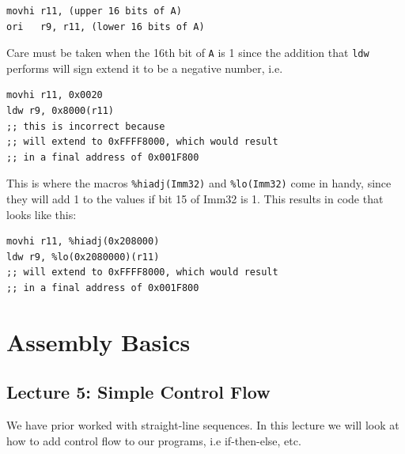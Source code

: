 \documentclass[../notes.tex]{subfiles}
\begin{document}
\begin{listing}[H]
\begin{verbatim}
movhi r11, (upper 16 bits of A)
ori   r9, r11, (lower 16 bits of A)
\end{verbatim}
\end{listing}


Care must be taken when the 16th bit of \texttt{A}  is 1 since the addition that \texttt{ldw} performs will sign extend it to be a negative number, i.e. 

\begin{listing}[H]
	\begin{verbatim}
movhi r11, 0x0020
ldw r9, 0x8000(r11)
;; this is incorrect because
;; will extend to 0xFFFF8000, which would result
;; in a final address of 0x001F800
\end{verbatim}
\end{listing}


This is where the macros \texttt{\%hiadj(Imm32)}  and \texttt{\%lo(Imm32)} come in handy, since they will add 1 to the values if bit 15 of Imm32 is 1. 
This results in code that looks like this:


\begin{listing}[H]
	\begin{verbatim}
movhi r11, %hiadj(0x208000)
ldw r9, %lo(0x2080000)(r11)
;; will extend to 0xFFFF8000, which would result
;; in a final address of 0x001F800
\end{verbatim}
\end{listing}


\section{Assembly Basics}
\subsection{Lecture 5: Simple Control Flow}

We have prior worked with straight-line sequences.
In this lecture we will look at how to add control flow to our programs, i.e if-then-else, etc.


\end{document}
